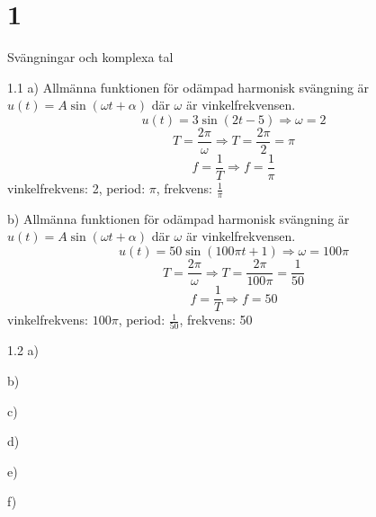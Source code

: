 \chapter{1}{Svängningar och komplexa tal}
\begin{task}{1.1 a)}
Allmänna funktionen för odämpad harmonisk svängning är $u(t)=A\sin(\omega t + \alpha)$ där $\omega$ är vinkelfrekvensen.
\[u(t)=3\sin(2t-5) \Rightarrow \omega=2\]
\[T=\frac{2\pi}{\omega} \Rightarrow T = \frac{2\pi}{2} = \pi\]
\[f=\frac{1}{T} \Rightarrow f = \frac{1}{\pi}\]
\ans vinkelfrekvens: 2, period: $\pi$, frekvens: $\frac{1}{\pi}$
\end{task}

\begin{task}{b)}
	Allmänna funktionen för odämpad harmonisk svängning är $u(t)=A\sin(\omega t + \alpha)$ där $\omega$ är vinkelfrekvensen.
	\[u(t)=50\sin(100\pi t+1) \Rightarrow \omega=100\pi\]
	\[T=\frac{2\pi}{\omega} \Rightarrow T = \frac{2\pi}{100\pi} = \frac{1}{50}\]
	\[f=\frac{1}{T} \Rightarrow f = 50\]
	\ans vinkelfrekvens: $100\pi$, period: $\frac{1}{50}$, frekvens: 50
\end{task}

\begin{task}{1.2 a)}
\end{task}

\begin{task}{b)}
\end{task}

\begin{task}{c)}
\end{task}

\begin{task}{d)}
\end{task}

\begin{task}{e)}
\end{task}

\begin{task}{f)}
\end{task}

